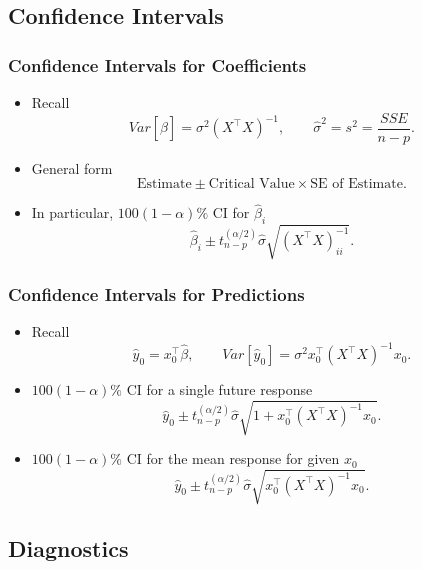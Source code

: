 \documentclass[serif,mathserif,professionalfont]{beamer}
\begin{document}
\subsection{Confidence Intervals}



\begin{frame}
	
	\frametitle{Confidence Intervals for Coefficients}
	
	\begin{itemize}
		\item Recall
		$$ Var\left[\widehat{\beta} \right] = \sigma^2 \left(X^\top X \right)^{-1}, \qquad \widehat{\sigma}^2 = s^2 = \frac{SSE}{n-p}. $$
		\item General form
		$$ \text{Estimate} \pm \text{Critical Value} \times \text{SE of Estimate}. $$
		\item In particular, $ 100(1-\alpha)\% $ CI for $ \widehat{\beta}_i $
		$$ \widehat{\beta}_i \pm t_{n-p}^{(\alpha/2)} \widehat{\sigma} \sqrt{\left(X^\top X \right)^{-1}_{ii}}. $$
	\end{itemize}
	
	
\end{frame}



\begin{frame}
	
	\frametitle{Confidence Intervals for Predictions}
	
		\begin{itemize}
		\item Recall
		$$ \widehat{y}_0 = x_0^\top \widehat{\beta}, \qquad Var \left[\widehat{y}_0 \right] = \sigma^2 x_0^\top \left(X^\top X \right)^{-1} x_0 . $$
		\item $ 100(1-\alpha)\% $ CI for a single future response
		$$ \widehat{y}_0 \pm t_{n-p}^{(\alpha/2)} \widehat{\sigma} \sqrt{1 + x_0^\top \left(X^\top X \right)^{-1} x_0}. $$
		\item $ 100(1-\alpha)\% $ CI for the mean response for given $ x_0 $
		$$ \widehat{y}_0 \pm t_{n-p}^{(\alpha/2)} \widehat{\sigma} \sqrt{x_0^\top \left(X^\top X \right)^{-1} x_0}. $$
	\end{itemize}
	
	
\end{frame}





\subsection{Diagnostics}
\end{document}
